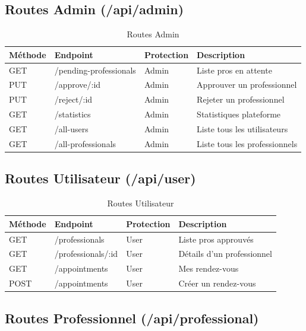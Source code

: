 \documentclass[12pt,a4paper]{article}
\begin{document}
\subsection{Routes Admin (/api/admin)}

\begin{table}[h]
\centering
\begin{tabular}{|l|l|l|p{4cm}|}
\hline
\textbf{Méthode} & \textbf{Endpoint} & \textbf{Protection} & \textbf{Description} \\
\hline
GET & /pending-professionals & Admin & Liste pros en attente \\
PUT & /approve/:id & Admin & Approuver un professionnel \\
PUT & /reject/:id & Admin & Rejeter un professionnel \\
GET & /statistics & Admin & Statistiques plateforme \\
GET & /all-users & Admin & Liste tous les utilisateurs \\
GET & /all-professionals & Admin & Liste tous les professionnels \\
\hline
\end{tabular}
\caption{Routes Admin}
\end{table}

\subsection{Routes Utilisateur (/api/user)}

\begin{table}[h]
\centering
\begin{tabular}{|l|l|l|p{4cm}|}
\hline
\textbf{Méthode} & \textbf{Endpoint} & \textbf{Protection} & \textbf{Description} \\
\hline
GET & /professionals & User & Liste pros approuvés \\
GET & /professionals/:id & User & Détails d'un professionnel \\
GET & /appointments & User & Mes rendez-vous \\
POST & /appointments & User & Créer un rendez-vous \\
\hline
\end{tabular}
\caption{Routes Utilisateur}
\end{table}

\subsection{Routes Professionnel (/api/professional)}
\end{document}
